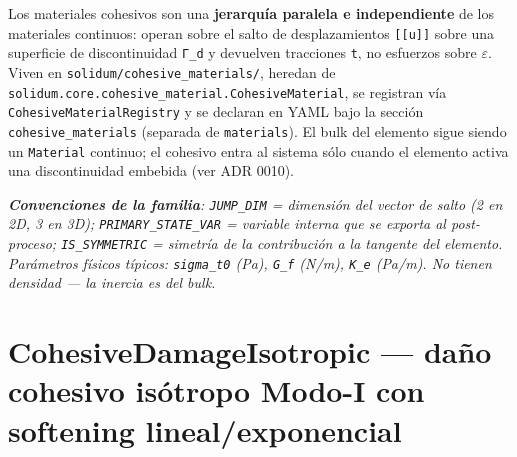 \documentclass[11pt,letterpaper,oneside]{report}
\begin{document}
Los materiales cohesivos son una \textbf{jerarquía paralela e independiente} de los materiales continuos: operan sobre el salto de desplazamientos \texttt{[[u]]} sobre una superficie de discontinuidad \texttt{Γ\_d} y devuelven tracciones \texttt{t}, no esfuerzos sobre \texttt{\ensuremath{\varepsilon}}. Viven en \texttt{solidum/cohesive\_materials/}, heredan de \texttt{solidum.core.cohesive\_material.CohesiveMaterial}, se registran vía \texttt{CohesiveMaterialRegistry} y se declaran en YAML bajo la sección \texttt{cohesive\_materials} (separada de \texttt{materials}). El bulk del elemento sigue siendo un \texttt{Material} continuo; el cohesivo entra al sistema sólo cuando el elemento activa una discontinuidad embebida (ver ADR 0010).

\textit{\textbf{Convenciones de la familia}: \texttt{JUMP\_DIM} = dimensión del vector de salto (2 en 2D, 3 en 3D); \texttt{PRIMARY\_STATE\_VAR} = variable interna que se exporta al post-proceso; \texttt{IS\_SYMMETRIC} = simetría de la contribución a la tangente del elemento. Parámetros físicos típicos: \texttt{sigma\_t0} (Pa), \texttt{G\_f} (N/m), \texttt{K\_e} (Pa/m). No tienen densidad --- la inercia es del bulk.}



\section{CohesiveDamageIsotropic --- daño cohesivo isótropo Modo-I con softening lineal/exponencial}
\end{document}

